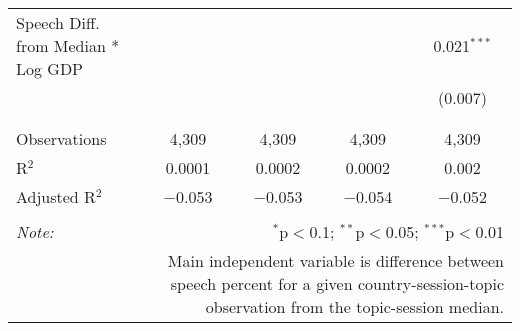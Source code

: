 \begin{table}[!htbp]
\begin{tabular}{@{\extracolsep{5pt}}lcccc}
 Speech Diff. from Median * Log GDP &  &  &  & 0.021$^{***}$ \\ 
  &  &  &  & (0.007) \\ 
  & & & & \\ 
\hline \\[-1.8ex] 
Observations & 4,309 & 4,309 & 4,309 & 4,309 \\ 
R$^{2}$ & 0.0001 & 0.0002 & 0.0002 & 0.002 \\ 
Adjusted R$^{2}$ & $-$0.053 & $-$0.053 & $-$0.054 & $-$0.052 \\ 
\hline 
\hline \\[-1.8ex] 
\textit{Note:}  & \multicolumn{4}{r}{$^{*}$p$<$0.1; $^{**}$p$<$0.05; $^{***}$p$<$0.01} \\ 
 & \multicolumn{4}{r}{Main independent variable is difference between speech percent for a given country-session-topic observation from the topic-session median.} \\ 
\end{tabular} 
\end{table} 
